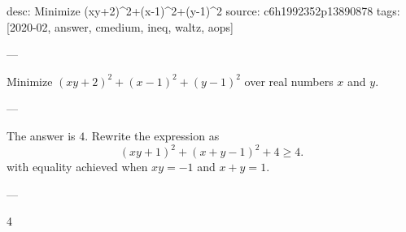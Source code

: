 desc: Minimize (xy+2)^2+(x-1)^2+(y-1)^2
source: c6h1992352p13890878
tags: [2020-02, answer, cmedium, ineq, waltz, aops]

---

Minimize $(xy+2)^2+(x-1)^2+(y-1)^2$ over real numbers $x$ and $y$.

---

The answer is $4$. Rewrite the expression as \[(xy+1)^2+(x+y-1)^2+4\ge4.\]
with equality achieved when $xy=-1$ and $x+y=1$.

---

4
